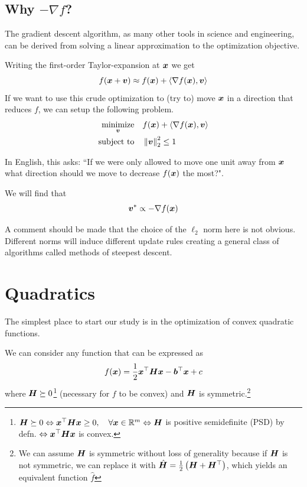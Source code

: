 \documentclass[11pt]{article}
\begin{document}
\subsection{Why $-\nabla f$?}

The gradient descent algorithm, as many other tools in science and engineering, can be derived from solving a linear approximation to the optimization objective.

Writing the first-order Taylor-expansion at $\bm{x}$ we get \[f(\bm{x}+\bm{v}) \approx f(\bm{x}) + \langle \nabla f(\bm{x}), \bm{v} \rangle\] If we want to use this crude optimization to (try to) move $\bm{x}$ in a direction that reduces $f$, we can setup the following problem.
\begin{align*} 
\operatorname*{minimize}_{\bm{v}} &\quad f(\bm{x}) + \langle \nabla f(\bm{x}), \bm{v} \rangle \\ 
\operatorname{subject\ to} &\quad \left\| \bm{v} \right\|_2^2 \leq 1
\end{align*}

In English, this asks: ``If we were only allowed to move one unit away from $\bm{x}$ what direction should we move to decrease $f(\bm{x})$ the most?".

We will find that \[\bm{v}^* \propto -\nabla f(\bm{x})\] 

A comment should be made that the choice of the $\ell_2$ norm here is not obvious. Different norms will induce different update rules creating a general class of algorithms called methods of steepest descent.

\section{Quadratics}

The simplest place to start our study is in the optimization of convex quadratic functions.

We can consider any function that can be expressed as
\[f(\bm{x}) = \frac{1}{2}\bm{x}^\top\bm{H}\bm{x} -\bm{b}^\top \bm{x} + c\]
where $\bm{H}\succeq 0$\footnote{$\bm{H}\succeq 0 \Leftrightarrow \bm{x}^\top\bm{H} \bm{x} \geq 0, \quad \forall \bm{x} \in \mathbb{R}^m \Leftrightarrow \bm{H} $ is positive semidefinite (PSD) by defn. $\Leftrightarrow \bm{x}^\top\bm{H}\bm{x} $ is convex.} (necessary for $f$ to be convex) and $\bm{H}$ is symmetric.\footnote{We can assume $\bm{H}$ is symmetric without loss of generality because if $\bm{H}$ is not symmetric, we can replace it with $\hat {\bm{H}} = \frac{1}{2}\left(\bm{H} + \bm{H}^\top\right)$, which yields an equivalent function $\hat f$}
\end{document}
